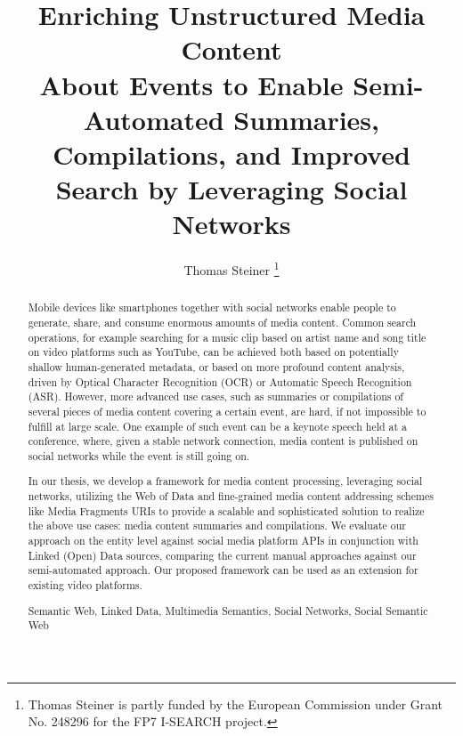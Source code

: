 \documentclass[runningheads,a4paper]{llncs}
\newcommand{\keywords}[1]{\par\addvspace\baselineskip
\noindent\keywordname\enspace\ignorespaces#1}
\begin{document}
\mainmatter  %

\title{Enriching Unstructured Media Content\\ About Events to Enable Semi-Automated Summaries, Compilations, and Improved\\ Search by Leveraging Social Networks}


\author{Thomas Steiner%
\thanks{Thomas Steiner is partly funded by the European Commission under Grant No. 248296 for the FP7 I-SEARCH project.}}



\maketitle
\begin{abstract}
Mobile devices like smartphones together with social networks enable people to generate, share, and consume enormous amounts of media content. Common search operations, for example searching for a music clip based on artist name and song title on video platforms such as YouTube, can be achieved both based on potentially shallow human-generated metadata, or based on more profound content analysis, driven by Optical Character Recognition (OCR) or Automatic Speech Recognition (ASR). However, more advanced use cases, such as summaries or compilations of several pieces of media content covering a certain event, are hard, if not impossible to fulfill at large scale. One example of such event can be a keynote speech held at a conference, where, given a stable network connection, media content is published on social networks while the event is still going on.

In our thesis, we develop a framework for media content processing, leveraging social networks, utilizing the Web of Data and fine-grained media content addressing schemes like Media Fragments URIs to provide a scalable and sophisticated solution to realize the above use cases: media content summaries and compilations. We evaluate our approach on the entity level against social media platform APIs in conjunction with Linked (Open) Data sources, comparing the current manual approaches against our semi-automated approach. Our proposed framework can be used as an extension for existing video platforms.
\keywords{Semantic Web, Linked Data, Multimedia Semantics, Social Networks, Social Semantic Web}
\end{abstract}
\end{document}
